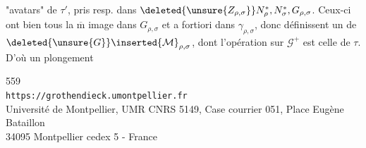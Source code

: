 "avatars" de \(\tau'\), pris resp. dans
\(\deleted{\unsure{Z_{\rho,\sigma}}}
N_\rho^*,N_\sigma^*,G_{\rho,\sigma}\).
Ceux-ci ont bien tous la \(\overline{\mathrm m}\) image dans
\(G_{\rho,\sigma}\) et a fortiori dans \(\gamma_{\rho,\sigma}\),
donc définissent un  de
\(\deleted{\unsure{G}}\inserted{\mathcal M}_{\rho,\sigma}\),
dont l'opération sur \(\mathcal G^+\) est celle de \(\tau\).
D'où un plongement


{\small
\begin{center}
559\\
\texttt{https://grothendieck.umontpellier.fr}\\
Université de Montpellier, UMR CNRS 5149, Case courrier 051, Place Eugène Bataillon\\
34095 Montpellier cedex 5 - France
\end{center}
}


